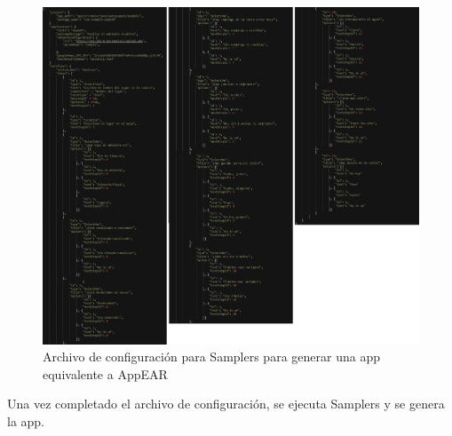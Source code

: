 \begin{figure}[H]
  \centering
   \includegraphics[scale=0.3]{06-caso_de_uso/archivo_configuracion.png} 
    \caption{Archivo de configuración para Samplers para generar una app equivalente a AppEAR}
\end{figure}

Una vez completado el archivo de configuración, se ejecuta Samplers y se genera la app.

